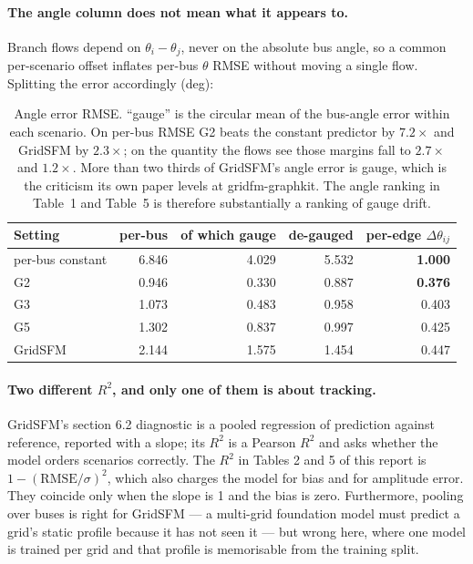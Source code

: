 \documentclass[10pt]{article}
\begin{document}
\paragraph{The angle column does not mean what it appears to.}  Branch flows
depend on $\theta_i-\theta_j$, never on the absolute bus angle, so a common
per-scenario offset inflates per-bus $\theta$ RMSE without moving a single flow.
Splitting the error accordingly (deg):

\begin{table}[H]
\centering\footnotesize
\begin{tabular}{lrrrr}
\toprule
Setting & per-bus & of which gauge & de-gauged & \textbf{per-edge $\Delta\theta_{ij}$}\\
\midrule
per-bus constant & 6.846 & 4.029 & 5.532 & \textbf{1.000}\\
G2 & 0.946 & 0.330 & 0.887 & \textbf{0.376}\\
G3 & 1.073 & 0.483 & 0.958 & 0.403\\
G5 & 1.302 & 0.837 & 0.997 & 0.425\\
GridSFM & 2.144 & 1.575 & 1.454 & 0.447\\
\bottomrule
\end{tabular}
\caption{Angle error RMSE.  ``gauge'' is the circular mean of the bus-angle
error within each scenario.  On per-bus RMSE G2 beats the constant predictor by
$7.2\times$ and GridSFM by $2.3\times$; on the quantity the flows see those
margins fall to $2.7\times$ and $1.2\times$.  More than two thirds of GridSFM's
angle error is gauge, which is the criticism its own paper levels at
gridfm-graphkit.  The angle ranking in Table~1 and Table~5 is therefore
substantially a ranking of gauge drift.}
\end{table}

\paragraph{Two different $R^2$, and only one of them is about tracking.}
GridSFM's section 6.2 diagnostic is a pooled regression of prediction against
reference, reported with a slope; its $R^2$ is a Pearson $R^2$ and asks whether
the model orders scenarios correctly.  The $R^2$ in Tables 2 and 5 of this
report is $1-(\mathrm{RMSE}/\sigma)^2$, which also charges the model for bias
and for amplitude error.  They coincide only when the slope is 1 and the bias
is zero.  Furthermore, pooling over buses is right for GridSFM --- a multi-grid
foundation model must predict a grid's static profile because it has not seen
it --- but wrong here, where one model is trained per grid and that profile is
memorisable from the training split.
\end{document}
